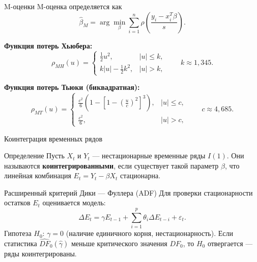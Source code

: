 \documentclass{beamer}
\begin{document}
	\begin{frame}{M-оценки}
		\small
		M-оценка определяется как
		\begin{equation*}
			\widehat{\beta}_M = \arg\min_{\beta} \sum_{i=1}^n \rho\left(\frac{y_i - x_i^T\beta}{s}\right).
		\end{equation*}
		
		\textbf{Функция потерь Хьюбера:}
		\begin{equation*}
			\rho_{MH}(u) = \begin{cases}
				\frac{1}{2}u^2, & |u| \le k, \\
				k|u| - \frac{1}{2}k^2, & |u| > k,
			\end{cases}
			\qquad k \approx 1{,}345.
		\end{equation*}
		
		\vspace{0.2cm}
		\textbf{Функция потерь Тьюки (биквадратная):}
		\begin{equation*}
			\rho_{MT}(u) = \begin{cases}
				\frac{c^2}{6}\left(1 - \left[1 - \left(\frac{u}{c}\right)^2\right]^3\right), & |u| \le c, \\[4pt]
				\frac{c^2}{6}, & |u| > c,
			\end{cases}
			\qquad c \approx 4{,}685.
		\end{equation*}
	\end{frame}
	
	\begin{frame}{Коинтеграция временных рядов}
		\begin{block}{Определение}
			Пусть $X_t$ и $Y_t$ --- нестационарные временные ряды $I(1)$. Они называются \textbf{коинтегрированными}, если существует такой параметр $\beta$, что линейная комбинация $E_t = Y_t - \beta X_t$ стационарна.
		\end{block}
		\begin{block}{Расширенный критерий Дики --- Фуллера (ADF)}
			Для проверки стационарности остатков $E_t$ оценивается модель:
			\begin{equation*}
				\Delta E_t = \gamma E_{t-1} + \sum_{i=1}^{p} \theta_i \Delta E_{t-i} + \varepsilon_t.
			\end{equation*}
			Гипотеза $H_0$: $\gamma = 0$ (наличие единичного корня, нестационарность). Если статистика $\widehat{DF}_0(\widehat\gamma)$ меньше критического значения $DF_0$, то $H_0$ отвергается --- ряды коинтегрированы.
		\end{block}
	\end{frame}
	
\end{document}
